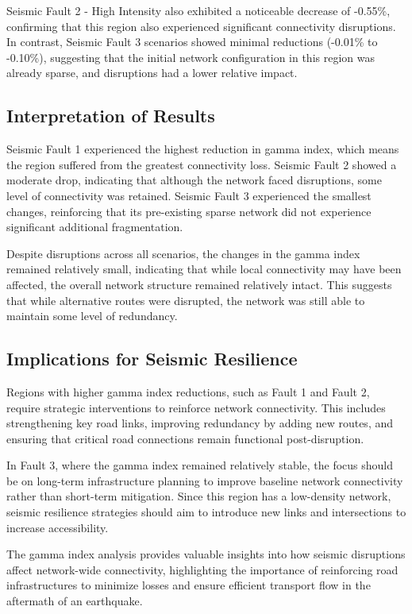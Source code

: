 Seismic Fault 2 - High Intensity also exhibited a noticeable decrease of -0.55\%, confirming that this region also experienced significant connectivity disruptions. In contrast, Seismic Fault 3 scenarios showed minimal reductions (-0.01\% to -0.10\%), suggesting that the initial network configuration in this region was already sparse, and disruptions had a lower relative impact.

\subsection{Interpretation of Results}
Seismic Fault 1 experienced the highest reduction in gamma index, which means the region suffered from the greatest connectivity loss. Seismic Fault 2 showed a moderate drop, indicating that although the network faced disruptions, some level of connectivity was retained. Seismic Fault 3 experienced the smallest changes, reinforcing that its pre-existing sparse network did not experience significant additional fragmentation.

Despite disruptions across all scenarios, the changes in the gamma index remained relatively small, indicating that while local connectivity may have been affected, the overall network structure remained relatively intact. This suggests that while alternative routes were disrupted, the network was still able to maintain some level of redundancy.

\subsection{Implications for Seismic Resilience}
Regions with higher gamma index reductions, such as Fault 1 and Fault 2, require strategic interventions to reinforce network connectivity. This includes strengthening key road links, improving redundancy by adding new routes, and ensuring that critical road connections remain functional post-disruption.

In Fault 3, where the gamma index remained relatively stable, the focus should be on long-term infrastructure planning to improve baseline network connectivity rather than short-term mitigation. Since this region has a low-density network, seismic resilience strategies should aim to introduce new links and intersections to increase accessibility.

The gamma index analysis provides valuable insights into how seismic disruptions affect network-wide connectivity, highlighting the importance of reinforcing road infrastructures to minimize losses and ensure efficient transport flow in the aftermath of an earthquake.

